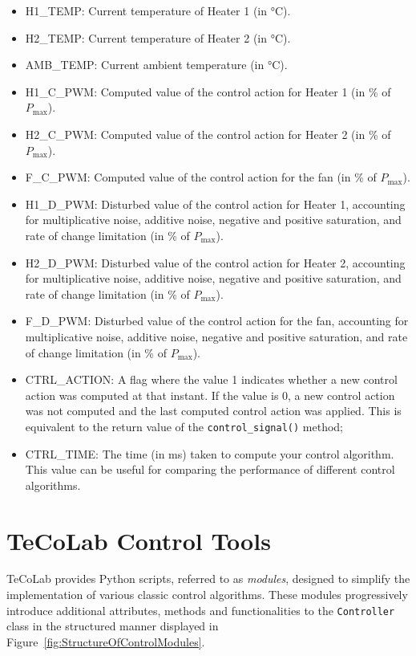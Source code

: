 \documentclass[12pt]{report}
\begin{document}
\begin{itemize}
\item H1\_TEMP: Current temperature of Heater 1 (in °C).
\item H2\_TEMP: Current temperature of Heater 2 (in °C).
\item AMB\_TEMP: Current ambient temperature (in °C).
\item H1\_C\_PWM: Computed value of the control action for Heater 1 (in \% of $P_{\text{max}}$).
\item H2\_C\_PWM: Computed value of the control action for Heater 2 (in \% of $P_{\text{max}}$).
\item F\_C\_PWM: Computed value of the control action for the fan (in \% of $P_{\text{max}}$).
\item H1\_D\_PWM: Disturbed value of the control action for Heater 1, accounting for multiplicative noise, additive noise, negative and positive saturation, and rate of change limitation (in \% of $P_{\text{max}}$).
\item H2\_D\_PWM: Disturbed value of the control action for Heater 2, accounting for multiplicative noise, additive noise, negative and positive saturation, and rate of change limitation (in \% of $P_{\text{max}}$).
\item F\_D\_PWM: Disturbed value of the control action for the fan, accounting for multiplicative noise, additive noise, negative and positive saturation, and rate of change limitation (in \% of $P_{\text{max}}$).
\item CTRL\_ACTION: A flag where the value 1 indicates whether a new control action was computed at that instant. If the value is 0, a new control action was not computed and the last computed control action was applied. This is equivalent to the return value of the \texttt{control\_signal()} method;
\item CTRL\_TIME: The time (in ms) taken to compute your control algorithm. This value can be useful for comparing the performance of different control algorithms.
\end{itemize}

\chapter{TeCoLab Control Tools}\label{chap:ControlTools}

TeCoLab provides Python scripts, referred to as \emph{modules}, designed to simplify the implementation of various classic control algorithms. These modules progressively introduce additional attributes, methods and functionalities to the \texttt{Controller} class in the structured manner displayed in Figure~\ref{fig:StructureOfControlModules}.
\end{document}
